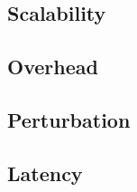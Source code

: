 \subsection{Scalability}


\subsection{Overhead}


\subsection{Perturbation}


\subsection{Latency}




